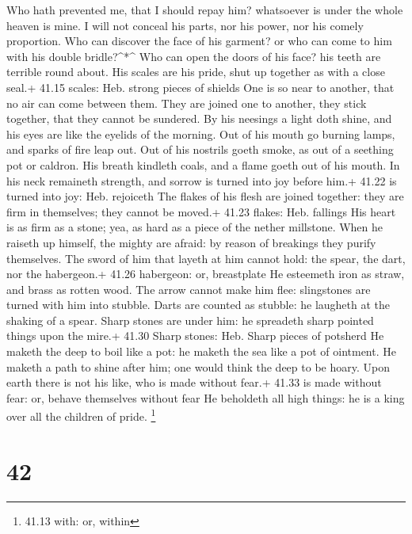  Who hath prevented me, that I should repay him? whatsoever
is under the whole heaven is mine.  I will not conceal his
parts, nor his power, nor his comely proportion.  Who can
discover the face of his garment? or who can come to him with his double
bridle?\^{}*\^{}  Who can open the doors of his face? his
teeth are terrible round about.  His scales are his pride,
shut up together as with a close seal.+ 41.15 scales: Heb. strong pieces
of shields  One is so near to another, that no air can come
between them.  They are joined one to another, they stick
together, that they cannot be sundered.  By his neesings a
light doth shine, and his eyes are like the eyelids of the morning.
 Out of his mouth go burning lamps, and sparks of fire leap
out.  Out of his nostrils goeth smoke, as out of a seething
pot or caldron.  His breath kindleth coals, and a flame
goeth out of his mouth.  In his neck remaineth strength,
and sorrow is turned into joy before him.+ 41.22 is turned into joy:
Heb. rejoiceth  The flakes of his flesh are joined
together: they are firm in themselves; they cannot be moved.+ 41.23
flakes: Heb. fallings  His heart is as firm as a stone;
yea, as hard as a piece of the nether millstone.  When he
raiseth up himself, the mighty are afraid: by reason of breakings they
purify themselves.  The sword of him that layeth at him
cannot hold: the spear, the dart, nor the habergeon.+ 41.26 habergeon:
or, breastplate  He esteemeth iron as straw, and brass as
rotten wood.  The arrow cannot make him flee: slingstones
are turned with him into stubble.  Darts are counted as
stubble: he laugheth at the shaking of a spear.  Sharp
stones are under him: he spreadeth sharp pointed things upon the mire.+
41.30 Sharp stones: Heb. Sharp pieces of potsherd  He
maketh the deep to boil like a pot: he maketh the sea like a pot of
ointment.  He maketh a path to shine after him; one would
think the deep to be hoary.  Upon earth there is not his
like, who is made without fear.+ 41.33 is made without fear: or, behave
themselves without fear  He beholdeth all high things: he
is a king over all the children of pride. \footnote{41.13 with: or,
  within}

\hypertarget{section-41}{%
\section{42}\label{section-41}}

